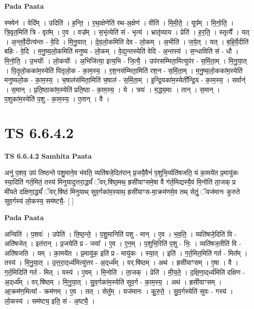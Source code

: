 \documentclass[17pt]{extarticle}
\begin{document}
\textbf{Pada Paata} \newline

स्फ्येन॑ । वेदि᳚म् । उदिति॑ । ह॒न्ति॒ । र॒था॒क्षेणेति॑ रथ-अ॒क्षेण॑ । वीति॑ । मि॒मी॒ते॒ । यूप᳚म् । मि॒नो॒ति॒ । त्रि॒वृत॒मिति॑ त्रि - वृत᳚म् । ए॒व । वज्र᳚म् । स॒भृंत्येति॑ सं - भृत्य॑ । भ्रातृ॑व्याय । प्रेति॑ । ह॒र॒ति॒ । स्तृत्यै᳚ । यत् । अ॒न्त॒र्वे॒दीत्य॑न्तः - वे॒दि । मि॒नु॒यात् । दे॒व॒लो॒कमिति॑ देव - लो॒कम् । अ॒भीति॑ । ज॒ये॒त् । यत् । ब॒हि॒र्वे॒दीति॑ बहिः - वे॒दि । म॒नु॒ष्य॒लो॒कमिति॑ मनुष्य - लो॒कम् । वे॒द्य॒न्तस्येति॑ वेदि - अ॒न्तस्य॑ । स॒न्धाविति॑ सं - धौ । मि॒नो॒ति॒ । उ॒भयोः᳚ । लो॒कयोः᳚ । अ॒भिजि॑त्या॒ इत्य॒भि - जि॒त्यै॒ । उप॑रसम्मिता॒मित्युप॑र - स॒मिं॒ता॒म् । मि॒नु॒या॒त् । पि॒तृ॒लो॒कका॑म॒स्येति॑ पितृलो॒क - का॒म॒स्य॒ । र॒श॒नस॑म्मिता॒मिति॑ रश॒न - स॒मिं॒ता॒म् । म॒नु॒ष्य॒लो॒कका॑म॒स्येति॑ मनुष्यलो॒क - का॒म॒स्य॒ । च॒षाल॑संमिता॒मिति॑ च॒षाल॑ - स॒मिं॒ता॒म् । इ॒न्द्रि॒यका॑म॒स्येती᳚न्द्रि॒य - का॒म॒स्य॒ । सर्वान्॑ । स॒मान् । प्र॒ति॒ष्ठाका॑म॒स्येति॑ प्रति॒ष्ठा - का॒म॒स्य॒ । ये । त्रयः॑ । म॒द्ध्य॒माः । तान् । स॒मान् । प॒शुका॑म॒स्येति॑ प॒शु - का॒म॒स्य॒ । ए॒तान् । वै ।  \newline





\section{ TS 6.6.4.2 }

\textbf{TS 6.6.4.2 } \newline
\textbf{Samhita Paata} \newline

अनु॑ प॒शव॒ उप॑ तिष्ठन्ते पशु॒माने॒व भ॑वति॒ व्यति॑षजे॒दित॑रान् प्र॒जयै॒वैनं॑ प॒शुभि॒र्व्यति॑षजति॒ यं का॒मये॑त प्र॒मायु॑कः स्या॒दिति॑ गर्त॒मितं॒ तस्य॑ मिनुयादुत्तरा॒र्द्ध्यं॑ ॅवर्.षि॑ष्ठ॒मथ॒ ह्रसी॑याꣳसमे॒षा वै ग॑र्त॒मिद्यस्यै॒वं मि॒नोति॑ ता॒जक् प्र मी॑यते दक्षिणा॒र्द्ध्यं॑ ॅवर्.षि॑ष्ठं मिनुयाथ् सुव॒र्गका॑म॒स्याथ॒ ह्रसी॑याꣳस-मा॒क्रम॑णमे॒व तथ् सेतुं॒ ॅयज॑मानः कुरुते सुव॒र्गस्य॑ लो॒कस्य॒ सम॑ष्ट्यै॒- [  ] \newline

\textbf{Pada Paata} \newline

अन्विति॑ । प॒शवः॑ । उपेति॑ । ति॒ष्ठ॒न्ते॒ । प॒शु॒मानिति॑ पशु - मान् । ए॒व । भ॒व॒ति॒ । व्यति॑षजे॒दिति॑ वि - अति॑षजेत् । इत॑रान् । प्र॒जयेति॑ प्र - जया᳚ । ए॒व । ए॒न॒म् । प॒शुभि॒रिति॑ प॒शु - भिः॒ । व्यति॑षज॒तीति॑ वि - अति॑षजति । यम् । का॒मये॑त । प्र॒मायु॑क॒ इति॑ प्र - मायु॑कः । स्या॒त् । इति॑ । ग॒र्त॒मित॒मिति॑ गर्त - मित᳚म् । तस्य॑ । मि॒नु॒या॒त् । उ॒त्त॒रा॒द्‌र्ध्य॑मित्यु॑त्तर - अ॒द्‌र्ध्य᳚म् । वर्.षि॑ष्ठम् । अथ॑ । ह्रसी॑याꣳसम् । ए॒षा । वै । ग॒र्त॒मिदिति॑ गर्त - मित् । यस्य॑ । ए॒वम् । मि॒नोति॑ । ता॒जक् । प्रेति॑ । मी॒य॒ते॒ । द॒क्षि॒णा॒द्‌र्ध्य॑मिति॑ दक्षिण - अ॒द्‌र्ध्य᳚म् । वर्.षि॑ष्ठम् । मि॒नु॒या॒त् । सु॒व॒र्गका॑म॒स्येति॑ सुव॒र्ग - का॒म॒स्य॒ । अथ॑ । ह्रसी॑याꣳसम् । आ॒क्रम॑ण॒मित्या᳚ - क्रम॑णम् । ए॒व । तत् । सेतु᳚म् । यज॑मानः । कु॒रु॒ते॒ । सु॒व॒र्गस्येति॑ सुवः - गस्य॑ । लो॒कस्य॑ । सम॑ष्ट्य॒ इति॒ सं - अ॒ष्ट्यै॒ ।  \newline
\end{document}
